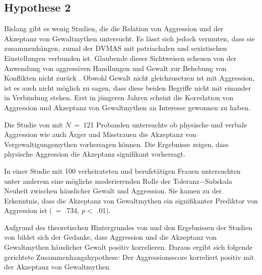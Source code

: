 \subsection{Hypothese 2}    \label{subsec_2.2.2}
Bislang gibt es wenig Studien, die die Relation von Aggression und der Akzeptanz von Gewaltmythen untersucht. Es lässt sich jedoch vermuten, dass sie zusammenhängen, zumal der DVMAS mit patriachalen und sexistischen Einstellungen verbunden ist. Glaubende dieser Sichtweisen scheuen von der Anwendung von aggressiven Handlungen und Gewalt zur Behebung von Konflikten nicht zurück \parencite{DVMAS_Peters}. Obwohl Gewalt nicht gleichzusetzen ist mit Aggression, ist es auch nicht möglich zu sagen, dass diese beiden Begriffe nicht mit einander in Verbindung stehen.
Erst in jüngeren Jahren scheint die Korrelation von Aggression und Akzeptanz von Gewaltmythen an Interesse gewonnen zu haben. 

Die Studie von \textcite{H2_u_3_Bhogal_2016} mit $N$~=~121 Probanden untersuchte ob physische und verbale Aggression wie auch Ärger und Misstrauen die Akzeptanz von Vergewaltigungsmythen vorhersagen können. Die Ergebnisse zeigen, dass physische Aggression die Akzeptanz signifikant vorhersagt.

In einer Studie mit 100 verheirateten und berufstätigen Frauen untersuchten \textcite{H1_moderation_2020} unter anderem eine mögliche moderierenden Rolle der Toleranz$-$Subskala Neuheit zwischen häuslicher Gewalt und Aggression. Sie kamen zu der Erkenntnis, dass die Akzeptanz von Gewaltmythen ein signifikanter Prediktor von Aggression ist (\textbeta~=~.734, $p<$ .01).

Aufgrund des theoretischen Hintergrundes von \textcite{DVMAS_Peters} und den Ergebnissen der Studien von \textcite{H1_moderation_2020, H2_u_3_Bhogal_2016} bildet sich der Gedanke, dass Aggression und die Akzeptanz von Gewaltmythen häuslicher Gewalt positiv korrelieren. Daraus ergibt sich folgende gerichtete Zusammenhangshypothese: Der Aggressionsscore korreliert positiv mit der Akzeptanz von Gewaltmythen


